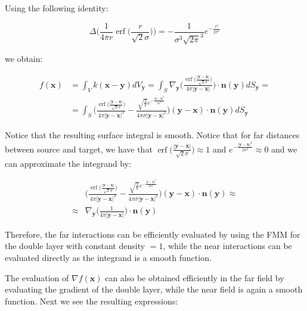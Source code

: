 \documentclass[11pt]{article}
\DeclareMathOperator\erf{erf}
\newcommand\bx{\boldsymbol x}
\newcommand\by{\boldsymbol y}
\newcommand\bn{\boldsymbol n}
\begin{document}
Using the following identity:

\begin{equation}
\Delta\Big(\frac{1}{4\pi r}\erf\Big(\frac{r}{\sqrt{2}\sigma}\Big)\Big)=-\frac{1}{\sigma^3\sqrt{2\pi}^3}e^{-\frac{r^2}{2\sigma^2}}
\end{equation}
 
 we obtain:
 
\begin{equation}\label{surf_f}
\begin{aligned}
f(\bx)&=\int_{V}k(\bx-\by)dV_{\by}=\int_{\mathit{S}}\nabla_{\by}\Big(\frac{\erf\big(\frac{|\by-\bx|}{\sqrt{2}\sigma}\big)}{4\pi|\by-\bx|}\Big)\cdot\bn(\by)dS_{\by}=\\
&=\int_{\mathit{S}}\Bigg(\frac{\erf\big(\frac{|\by-\bx|}{\sqrt{2}\sigma}\big)}{4\pi|\by-\bx|^3}-\frac{\sqrt{\frac{2}{\pi}}e^{-\frac{|\by-\bx|^2}{2\sigma^2}}}{4\pi\sigma|\by-\bx|^2}\Bigg)(\by-\bx)\cdot\bn(\by)dS_{\by}
\end{aligned}
\end{equation}

Notice that the resulting surface integral is smooth. Notice that for far distances between source and target, we have that $\erf\big(\frac{|\by-\bx|}{\sqrt{2}\sigma}\big)\approx 1$ and $e^{-\frac{|\by-\bx|^2}{2\sigma^2}}\approx 0$ and we can approximate the integrand by:

\begin{equation}
\begin{aligned}
&\Bigg(\frac{\erf\big(\frac{|\by-\bx|}{\sqrt{2}\sigma}\big)}{4\pi|\by-\bx|^3}-\frac{\sqrt{\frac{2}{\pi}}e^{-\frac{|\by-\bx|^2}{2\sigma^2}}}{4\pi\sigma|\by-\bx|^2}\Bigg)(\by-\bx)\cdot\bn(\by)\approx\\
\approx &\nabla_{\by}\Big(\frac{1}{4\pi|\by-\bx|}\Big)\cdot\bn(\by)
\end{aligned}
\end{equation}

Therefore, the far interactions can be efficiently evaluated by using the FMM for the double layer with constant density $=1$, while the near interactions can be evaluated directly as the integrand is a smooth function.

The evaluation of $\nabla f(\bx)$ can also be obtained efficiently in the far field by evaluating the gradient of the double layer, while the near field is again a smooth function. Next we see the resulting expressions:
\end{document}
